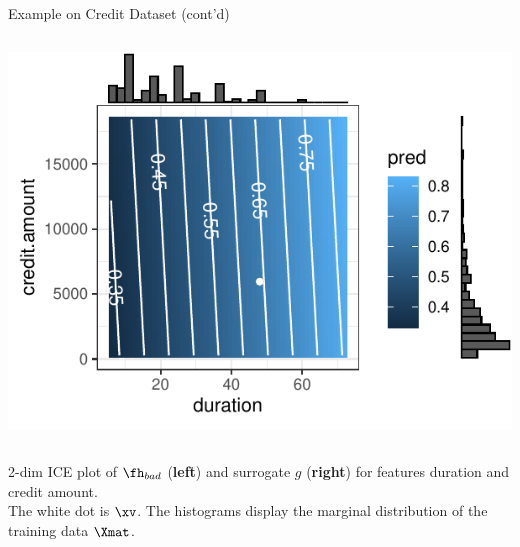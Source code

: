 \documentclass[11pt,compress,t,notes=noshow, aspectratio=169, xcolor=table]{beamer}
\begin{document}
\begin{frame}{Example on Credit Dataset (cont'd)}
\begin{columns}[totalwidth=\textwidth]
\begin{column}{0.46\textwidth}
\begin{center}
				\includegraphics[width=1\textwidth]{figure/lime_credit_ice2.pdf}
		\end{center}
			
	\end{column}
\end{columns}
\vspace{-0.4cm}
\begin{center}
		{2-dim ICE plot of $\fh_{bad}$ (\textbf{left}) and surrogate $g$ (\textbf{right}) for features duration and credit amount. \\The white dot is $\xv$. The histograms display the marginal distribution of the training data $\Xmat$.}
\end{center}

\end{frame}
\end{document}
